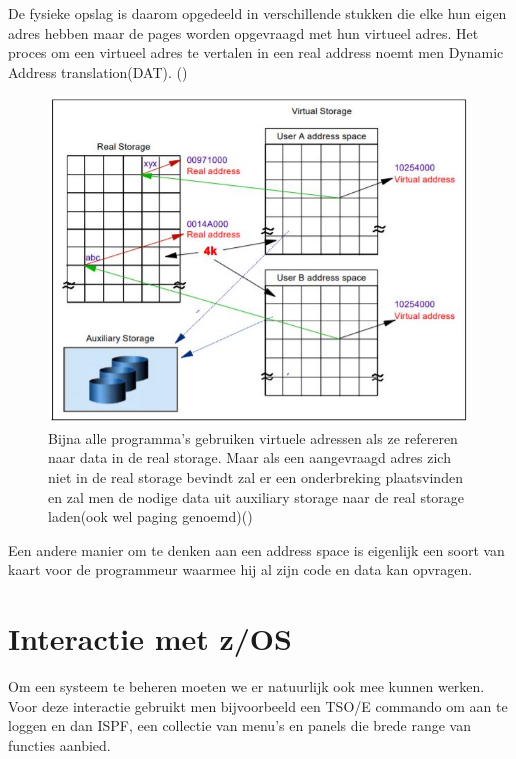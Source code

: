 De fysieke opslag is daarom opgedeeld in verschillende stukken die elke hun eigen adres hebben maar de pages worden opgevraagd met hun virtueel adres. Het proces om een virtueel adres te vertalen in een real address noemt men Dynamic Address translation(DAT). (\cite{Ebbers2011})

\begin{figure}[h]
	\centering
	\includegraphics{img/Storage}
	\caption[Visualisatie van het concept van virtuele storage]{Bijna alle programma's gebruiken virtuele adressen als ze refereren naar data in de real storage. Maar als een aangevraagd adres zich niet in de real storage bevindt zal er een onderbreking plaatsvinden en zal men de nodige data uit auxiliary storage naar de real storage laden(ook wel paging genoemd)(\cite{Ebbers2011})}
	\label{fig:storage}
\end{figure}

Een andere manier om te denken aan een address space is eigenlijk een soort van kaart voor de programmeur waarmee hij al zijn code en data kan opvragen.

\section{Interactie met z/OS}
\label{sec:interactie met z/OS}

Om een systeem te beheren moeten we er natuurlijk ook mee kunnen werken. Voor deze interactie gebruikt men bijvoorbeeld een TSO/E commando om aan te loggen en dan ISPF, een collectie van menu's en panels die brede range van functies aanbied.

